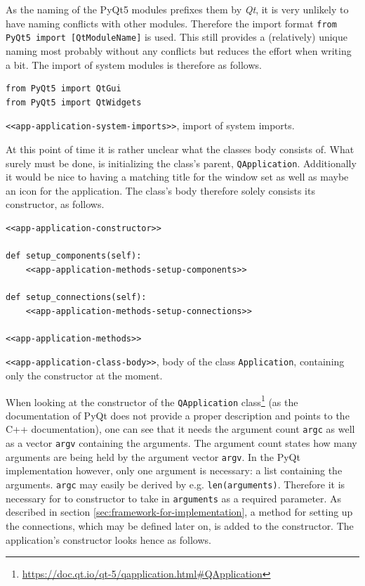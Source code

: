 \documentclass[10pt, openright, notitlepage]{scrreprt}
\begin{document}
As the naming of the PyQt5 modules prefixes them by \emph{Qt}, it is very unlikely to
have naming conflicts with other modules. Therefore the import format \texttt{from
PyQt5 import [QtModuleName]} is used. This still provides a (relatively) unique
naming most probably without any conflicts but reduces the effort when
writing a bit. The import of system modules is therefore as follows.

\begin{listing}[H]
\begin{verbatim}
from PyQt5 import QtGui
from PyQt5 import QtWidgets
\end{verbatim}
\caption{\label{app-application-system-imports}
\texttt{<<app-application-system-imports>>}, import of system imports.}
\end{listing}

At this point of time it is rather unclear what the classes body consists of.
What surely must be done, is initializing the class's parent, \texttt{QApplication}.
Additionally it would be nice to having a matching title for the window set as
well as maybe an icon for the application. The class's body therefore solely
consists its constructor, as follows.

\begin{listing}[H]
\begin{verbatim}
<<app-application-constructor>>

def setup_components(self):
    <<app-application-methods-setup-components>>

def setup_connections(self):
    <<app-application-methods-setup-connections>>

<<app-application-methods>>
\end{verbatim}
\caption{\label{app-application-class-body}
\texttt{<<app-application-class-body>>}, body of the class \texttt{Application}, containing only the constructor at the moment.}
\end{listing}

When looking at the constructor of the \texttt{QApplication}
class\footnote{\url{https://doc.qt.io/qt-5/qapplication.html\#QApplication}} (as the
documentation of PyQt does not provide a proper description and points to the
C++ documentation), one can see that it needs the argument count \texttt{argc} as well
as a vector \texttt{argv} containing the arguments. The argument count states how many
arguments are being held by the argument vector \texttt{argv}. In the PyQt
implementation however, only one argument is necessary: a list containing the
arguments. \texttt{argc} may easily be derived by e.g. \texttt{len(arguments)}. Therefore it
is necessary for to constructor to take in \texttt{arguments} as a required parameter.
As described in section \ref{sec:framework-for-implementation}, a method for setting up
the connections, which may be defined later on, is added to the constructor. The
application's constructor looks hence as follows.
\end{document}
